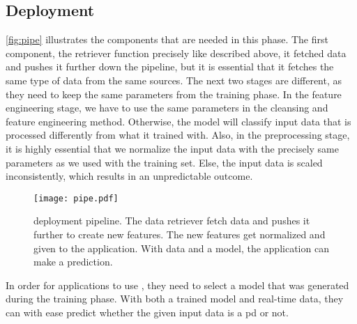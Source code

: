 \subsection{Deployment}
\autoref{fig:pipe} illustrates the components that are needed in this phase. The first component, the retriever function precisely like described above, it fetched data and pushes it further down the pipeline, but it is essential that it fetches the same type of data from the same sources. The next two stages are different, as they need to keep the same parameters from the training phase. In the feature engineering stage, we have to use the same parameters in the cleansing and feature engineering method. Otherwise, the model will classify input data that is processed differently from what it trained with. Also, in the preprocessing stage, it is highly essential that we normalize the input data with the precisely same parameters as we used with the training set. Else, the input data is scaled inconsistently, which results in an unpredictable outcome.

\begin{figure}[ht]
    \centering
    \texttt{[image: pipe.pdf]}
    \caption[\project's deployment pipeline]{deployment pipeline. The data retriever fetch data and pushes it further to create new features. The new features get normalized and given to the application. With data and a model, the application can make a prediction.}
    \label{fig:pipe}
\end{figure}

In order for applications to use \project, they need to select a model that was generated during the training phase. With both a trained model and real-time data, they can with ease predict whether the given input data is a \ac{pd} or not.